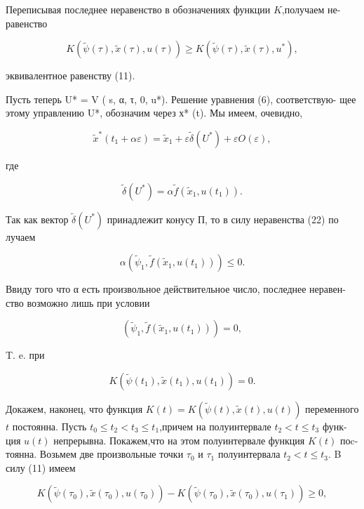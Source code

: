 \documentclass[10pt]{article}
\begin{document}
Переписывая последнее неравенство в обозначениях функции \(K\),получаем не- равенство

\[
K\left( {\widetilde{\psi }\left( \tau \right),\widetilde{x}\left( \tau \right),u\left( \tau \right) }\right)  \geq  K\left( {\widetilde{\psi }\left( \tau \right),\widetilde{x}\left( \tau \right),{u}^{ * }}\right),
\]

эквивалентное равенству (11).

Пусть теперь U* = V ( s, α, τ, 0, u*). Решение уравнения (6), соответствую- щее этому управлению U*, обозначим через х* (t). Мы имеем, очевидно,

\[
{\widetilde{x}}^{ * }\left( {{t}_{1} + {\alpha \varepsilon }}\right)  = {\widetilde{x}}_{1} + \varepsilon \widetilde{\delta }\left( {U}^{ * }\right)  + {\varepsilon O}\left( \varepsilon \right),
\]

где

\[
\widetilde{\delta }\left( {U}^{ * }\right)  = \alpha \widetilde{f}\left( {{\widetilde{x}}_{1},u\left( {t}_{1}\right) }\right).
\]

Так как вектор \(\widetilde{\delta }\left( {U}^{ * }\right)\) принадлежит конусу П, то в силу неравенства (22) по лучаем

\[
\alpha \left( {{\widetilde{\psi }}_{1},\widetilde{f}\left( {{\widetilde{x}}_{1},u\left( {t}_{1}\right) }\right) }\right)  \leq  0.
\]

Ввиду того что α есть произвольное действительное число, последнее неравен- ство возможно лишь при условии

\[
\left( {{\widetilde{\psi }}_{1},\widetilde{f}\left( {{\widetilde{x}}_{1},u\left( {t}_{1}\right) }\right) }\right)  = 0,
\]

T. e. при

\[
K\left( {\widetilde{\psi }\left( {t}_{1}\right),\widetilde{x}\left( {t}_{1}\right),u\left( {t}_{1}\right) }\right)  = 0. \tag{25}
\]

Докажем, наконец, что функция \(K\left( t\right)  = K\left( {\widetilde{\psi }\left( t\right),\widetilde{x}\left( t\right),u\left( t\right) }\right)\) переменного \(t\) постоянна. Пусть \({t}_{0} \leq  {t}_{2} < {t}_{3} \leq  {t}_{1}\),причем на полуинтервале \({t}_{2} < t \leq  {t}_{3}\) функ- ция \(u\left( t\right)\) непрерывна. Покажем,что на этом полуинтервале функция \(K\left( t\right)\) поc- тоянна. Возьмем две произвольные точки \({\tau }_{0}\) и \({\tau }_{1}\) полуинтервала \({t}_{2} < t \leq  {t}_{3}\). B силу (11) имеем

\[
K\left( {\widetilde{\psi }\left( {\tau }_{0}\right),\widetilde{x}\left( {\tau }_{0}\right),u\left( {\tau }_{0}\right) }\right)  - K\left( {\widetilde{\psi }\left( {\tau }_{0}\right),\widetilde{x}\left( {\tau }_{0}\right),u\left( {\tau }_{1}\right) }\right)  \geq  0,
\]
\end{document}
